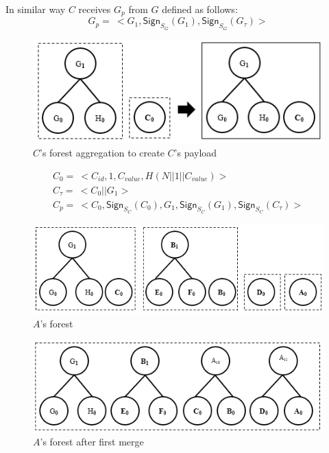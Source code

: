 \begin{exmp}
		In similar way $C$ receives $G_{p}$ from $G$ defined as follows:
		\begin{equation}
			G_{p} =\ <G_{1},\textsf{Sign}_{S_{G}}(G_{1}), \textsf{Sign}_{S_{G}}(G_{\tau})>
		\end{equation}
		\begin{figure}[h!]
			\centering
			\includegraphics[scale=1]{images/c-forest-payload.png}
			\caption{$C$'s forest aggregation to create $C$'s payload }
			\label{fig:c-forest-payload}
		\end{figure}
		\begin{equation}
			\begin{array}{l}
				C_{0} =\ <C_{id}, 1, C_{value}, H(N||1||C_{value})>\\
				C_{\tau} =\ <C_{0} || G_{1}>\\
				C_{p} =\ <C_{0},\textsf{Sign}_{S_{C}}(C_{0}),G_{1},\textsf{Sign}_{S_{C}}(G_{1}), \textsf{Sign}_{S_{C}}(C_{\tau})>
			\end{array}		
		\end{equation}

		\begin{figure}[h!]
			\centering
			\includegraphics[scale=1]{images/a-forest.png}
			\caption{$A$'s forest}
			\label{fig:a-forest}
		\end{figure}

		\begin{figure}[h!]
			\centering
			\includegraphics[scale=1]{images/a-forest-first-merge.png}
			\caption{$A$'s forest after first merge}
			\label{fig:a-forest}
		\end{figure}
		

\end{exmp}
